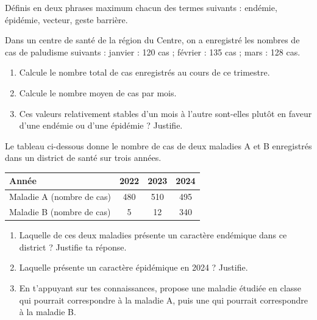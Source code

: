 \documentclass[11pt]{article}
\newcommand{\cle}[1]{{\popxbold\color{popdark}#1}}
\newcounter{popsec}
\newcounter{popsub}
\newcommand{\courssub}[1]{%
  \stepcounter{popsub}%
  \par\vspace{9pt}\noindent{\popxbold\fontsize{11.5}{13}\selectfont\color{popink}{\color{poporange}\thepopsec.\thepopsub}\hspace{6pt}#1}\par\nopagebreak\vspace{4pt}
}
\begin{document}
\begin{exercice}[Définitions]
Définis en deux phrases maximum chacun des termes suivants : \cle{endémie}, \cle{épidémie}, \cle{vecteur}, \cle{geste barrière}.
\end{exercice}

\begin{exercice}
Dans un centre de santé de la région du Centre, on a enregistré les nombres de cas de paludisme suivants : janvier : 120 cas ; février : 135 cas ; mars : 128 cas.
\begin{enumerate}
\item Calcule le nombre total de cas enregistrés au cours de ce trimestre.
\item Calcule le nombre moyen de cas par mois.
\item Ces valeurs relativement stables d'un mois à l'autre sont-elles plutôt en faveur d'une endémie ou d'une épidémie ? Justifie.
\end{enumerate}
\end{exercice}

\courssub{Je m'entraîne}

\begin{exercice}
Le tableau ci-dessous donne le nombre de cas de deux maladies A et B enregistrés dans un district de santé sur trois années.

\begin{center}
\begin{tabular}{|l|c|c|c|}
\hline
\rowcolor{popblueL} Année & 2022 & 2023 & 2024 \\
\hline
Maladie A (nombre de cas) & 480 & 510 & 495 \\
\hline
Maladie B (nombre de cas) & 5 & 12 & 340 \\
\hline
\end{tabular}
\end{center}

\begin{enumerate}
\item Laquelle de ces deux maladies présente un caractère endémique dans ce district ? Justifie ta réponse.
\item Laquelle présente un caractère épidémique en 2024 ? Justifie.
\item En t'appuyant sur tes connaissances, propose une maladie étudiée en classe qui pourrait correspondre à la maladie A, puis une qui pourrait correspondre à la maladie B.
\end{enumerate}
\end{exercice}
\end{document}
